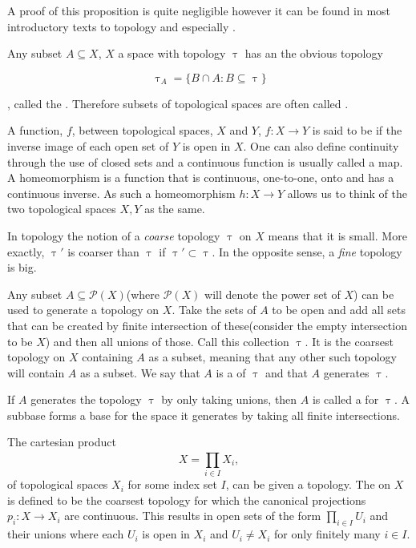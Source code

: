 \documentclass[../../main.tex]{subfiles}
\begin{document}
    A proof of this proposition is quite negligible however it can be found in most introductory texts to topology and especially \cite{armstrong-basictop}.

    Any subset $A \subseteq X$, $X$ a space with topology $\uptau$ has an the obvious topology 

    \begin{equation*}
        \uptau_A = \{B \cap A: B \subseteq \uptau\}
    \end{equation*}

    , called the . Therefore subsets of topological spaces are often called .
    
    A function, $f$, between topological spaces, $X$ and $Y$, $f:X\to Y$ is said to be  if the inverse image of each open set of $Y$ is open in $X$. One can also define continuity through the use of closed sets and a continuous function is usually called a map. A homeomorphism is a function that is continuous, one-to-one, onto and has a continuous inverse. As such a homeomorphism $h:X\to Y$ allows us to think of the two topological spaces $X, Y$ as the same.

    In topology the notion of a \textit{coarse} topology $\uptau$ on $X$ means that it is small. More exactly, $\uptau'$ is coarser than $\uptau$ if $\uptau' \subset \uptau$. In the opposite sense, a \textit{fine} topology is big.
    
    Any subset $A \subseteq \mathcal{P}(X)$(where $\mathcal{P}(X)$ will denote the power set of $X$) can be used to generate a topology on $X$. Take the sets of $A$ to be open and add all sets that can be created by finite intersection of these(consider the empty intersection to be $X$) and then all unions of those. Call this collection $\uptau$. It is the coarsest topology on $X$ containing $A$ as a subset, meaning that any other such topology will contain $A$ as a subset. We say that $A$ is a  of $\uptau$ and that $A$ generates $\uptau$.
    
    If $A$ generates the topology $\uptau$ by only taking unions, then $A$ is called a  for $\uptau$. A subbase forms a base for the space it generates by taking all finite intersections.
    
    \begin{definition}
        The cartesian product \[X=\prod_{i\in I}^{}X_i,\] of topological spaces $X_i$ for some index set $I$, can be given a topology. The  on $X$ is defined to be the coarsest topology for which the canonical projections $p_i:X\to X_i$ are continuous. This results in open sets of the form $ \prod_{i\in I}U_i$ and their unions where each $U_i$ is open in $X_i$ and $U_i \ne X_i$ for only finitely many $i\in I$.
    \end{definition}
\end{document}
